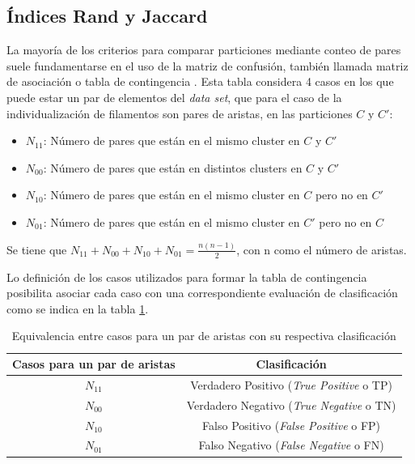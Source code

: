 \subsection{\'Indices Rand y Jaccard}

La mayor\'ia de los criterios para comparar particiones mediante conteo de pares suele fundamentarse en el uso de la matriz de confusi\'on, tambi\'en llamada matriz de asociaci\'on o tabla de contingencia \cite{meilua2007comparing}. Esta tabla considera 4 casos en los que puede estar un par de elementos del {\it data set}, que para el caso de la individualizaci\'on de filamentos son pares de aristas, en las particiones $C$ y $C'$:

\begin{itemize}
    \item $N_{11}$: N\'umero de pares que est\'an en el mismo cluster en $C$ y $C'$
    \item $N_{00}$: N\'umero de pares que est\'an en distintos clusters en $C$ y $C'$
    \item $N_{10}$: N\'umero de pares que est\'an en el mismo cluster en $C$ pero no en $C'$
    \item $N_{01}$: N\'umero de pares que est\'an en el mismo cluster en $C'$ pero no en $C$
\end{itemize}

Se tiene que $N_{11} + N_{00} + N_{10} + N_{01} = \frac{n(n-1)}{2}$, con n como el n\'umero de aristas.

Lo definici\'on de los casos utilizados para formar la tabla de contingencia posibilita asociar cada caso con una correspondiente evaluaci\'on de clasificaci\'on como se indica en la tabla \ref{tab:EquivParesClasificacion}.

\begin{table}[h]
    \centering
    \begin{tabular}{|c|c|}
    \hline
        Casos para un par de aristas & Clasificaci\'on \\ \hline
        $N_{11}$ & Verdadero Positivo ({\it True Positive} o TP) \\
        $N_{00}$ & Verdadero Negativo ({\it True Negative} o TN)\\
        $N_{10}$ & Falso Positivo ({\it False Positive} o FP)\\
        $N_{01}$ & Falso Negativo ({\it False Negative} o FN)\\ \hline
    \end{tabular}
    \caption{Equivalencia entre casos para un par de aristas con su respectiva clasificaci\'on}
    \label{tab:EquivParesClasificacion}
\end{table}

